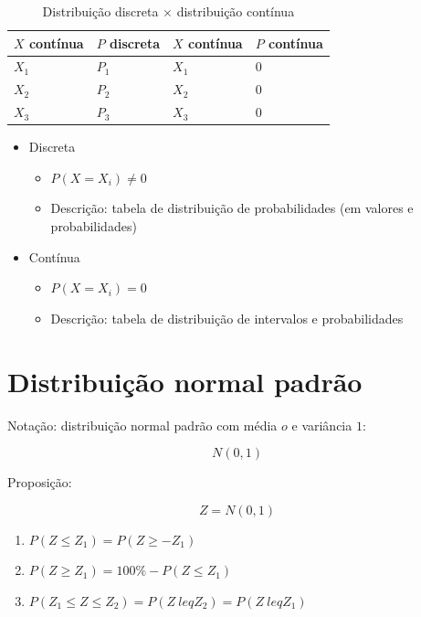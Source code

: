 \documentclass[a4paper]{article}
\begin{document}
	\begin{table}[h]
		\centering
		\caption{Distribuição discreta $\times$ distribuição contínua}
		\label{tab:pbinomial}
		\begin{tabular}{l|l|l|l}
			\textbf{$X$ contínua} & \textbf{$P$ discreta} & \textbf{$X$ contínua} & \textbf{$P$ contínua} \\ \hline
			$X_1$ & $P_1$ & $X_1$ & $0$ \\
			$X_2$ & $P_2$ & $X_2$ & $0$ \\
			$X_3$ & $P_3$ & $X_3$ & $0$
		\end{tabular}
	\end{table}

	\begin{itemize}
		\item Discreta
		\begin{itemize}
			\item $P(X=X_i) \neq 0$
			\item Descrição: tabela de distribuição de probabilidades (em valores e probabilidades)
		\end{itemize}
		\item Contínua
		\begin{itemize}
			\item $P(X=X_i) = 0$
			\item Descrição: tabela de distribuição de intervalos e probabilidades
		\end{itemize}
	\end{itemize}
	
	\section{Distribuição normal padrão}
	
	Notação: distribuição normal padrão com média $o$ e variância $1$:
	
	\begin{equation*}
		N(0,1)
	\end{equation*}
	
	Proposição:
	
	\begin{equation*}
	Z = N(0,1)
	\end{equation*}
	
	\begin{enumerate}
		\item $P(Z \leq Z_1) = P(Z \geq -Z_1)$
		\item $P(Z \geq Z_1) = 100\% - P(Z \leq Z_1)$
		\item $P(Z_1 \leq Z \leq Z_2) = P(Z \ leq Z_2) = P(Z \ leq Z_1)$
	\end{enumerate}
	
\end{document}
